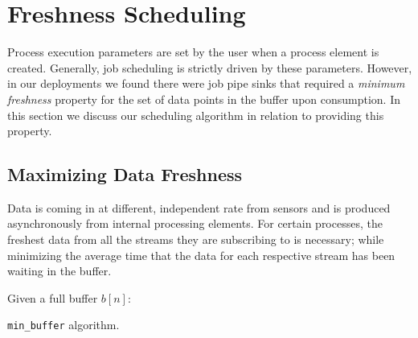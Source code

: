 \section{Freshness Scheduling}
Process execution parameters are set by the user when a process element is created.  Generally, job scheduling is strictly driven
by these parameters.  However, in our deployments we found there were job pipe sinks that required a \emph{minimum freshness}
property for the set of data points in the buffer upon consumption.  In this section we discuss our scheduling algorithm in
relation to providing this property.%


\subsection{Maximizing Data Freshness}
\label{sec:freshness}

Data is coming in at different, independent rate from sensors and is produced asynchronously from internal processing elements.
For certain processes, the freshest
data from all the streams they are subscribing to is necessary; while minimizing the average time that the data for each respective 
stream has 
been waiting in the buffer.


\begin{algorithm}[h!]
 \SetAlgoLined
 Given a full buffer $b[n]$:\\
 \caption{\texttt{min\_buffer} algorithm.}
 \label{alg:min_buffer}
\end{algorithm}


